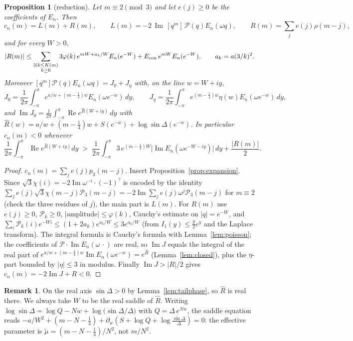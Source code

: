 \documentclass[11pt,reqno]{amsart}
\theoremstyle{plain}
\newtheorem{proposition}[theorem]{Proposition}
\theoremstyle{definition}
\newtheorem{remark}[theorem]{Remark}
\newcommand{\Rh}{\widehat{R}}
\newcommand{\cP}{\mathcal{P}}
\renewcommand{\Re}{\operatorname{Re}}
\renewcommand{\Im}{\operatorname{Im}}
\begin{document}
\begin{proposition}[reduction]\label{prop:reduce}
Let $m\equiv2\pmod 3$ and let $e(j)\ge0$ be the coefficients of $E_n$. Then
\[
c_n(m)=L(m)+R(m),\qquad L(m)=-2\,\Im\,[q^m]\,\cP(q)E_n(\omega q),\qquad R(m)=\sum_j e(j)\rho(m-j),
\]
and for every $W>0$,
\[
|R(m)|\le \sum_{\substack{3\mid k\le K(m)\\k\ge6}}3\varphi(k)\,e^{mW+a_k/W}E_n(e^{-W})+E_{\rm con}\,e^{mW}E_n(e^{-W}),\qquad a_k=a(3/k)^2 .
\]
Moreover $[q^m]\cP(q)E_n(\omega q)=J_0+J_\eta$ with, on the line $w=W+iy$,
\[
J_0=\frac1{2\pi}\int_{-\pi}^{\pi}e^{a/w+(m-\frac14)w}E_n(\omega e^{-w})\,dy,\qquad
J_\eta=\frac1{2\pi}\int_{-\pi}^{\pi}e^{(m-\frac14)w}\eta(w)E_n(\omega e^{-w})\,dy,
\]
and $\Im J_0=\frac1{2\pi}\int_{-\pi}^{\pi}\Re e^{\Rh(W+iy)}\,dy$ with $\Rh(w)=a/w+(m-\frac14)w+S(e^{-w})+\log\sin\Delta(e^{-w})$.
In particular $c_n(m)<0$ whenever
\begin{equation}\label{eq:signcrit}
\frac1{2\pi}\int_{-\pi}^{\pi}\Re e^{\Rh(W+iy)}dy\;>\;\frac1{2\pi}\int_{-\pi}^{\pi}3\,e^{(m-\frac14)W}\bigl|\Im E_n(\omega e^{-W-iy})\bigr|\,dy+\frac{|R(m)|}2 .
\end{equation}
\end{proposition}
\begin{proof}
$c_n(m)=\sum_je(j)p_3(m-j)$. Insert Proposition~\ref{prop:expansion}. Since $\sqrt3\chi(i)=-2\Im\omega^{-i}\cdot(-1)^{?}$ is encoded by
the identity $\sum_je(j)\sqrt3\chi(m-j)\cP_3(m-j)=-2\Im\sum_je(j)\omega^j\cP_3(m-j)$ for $m\equiv2$ (check the three residues of $j$),
the main part is $L(m)$. For $R(m)$ use $e(j)\ge0$, $\cP_k\ge0$, $|\text{amplitude}|\le\varphi(k)$, Cauchy's estimate on $|q|=e^{-W}$,
and $\sum_i\cP_k(i)e^{-Wi}\le(1+2a_k)e^{a_k/W}\le3e^{a_k/W}$ (from $I_1(y)\le\frac y2e^y$ and the Laplace transform). The integral
formula is Cauchy's formula with Lemma~\ref{lem:poisson}; the coefficients of $\cP\cdot\Im E_n(\omega\,\cdot)$ are real, so $\Im J$
equals the integral of the real part of $e^{a/w+(m-\frac14)w}\Im E_n(\omega e^{-w})=e^{\Rh}$ (Lemma~\ref{lem:closed}), plus the
$\eta$-part bounded by $|\eta|\le 3$ in modulus. Finally $\Im J>|R|/2$ gives $c_n(m)=-2\Im J+R<0$.
\end{proof}

\begin{remark}
On the real axis $\sin\Delta>0$ by Lemma~\ref{lem:tailphase}, so $\Rh$ is real there. We always take $W$ to be the real saddle of $\Rh$.
Writing $\log\sin\Delta=\log Q-Nw+\log\bigl(\sin\Delta/\Delta\bigr)$ with $Q=\Delta\,e^{Nw}$, the saddle equation reads
$-a/W^2+(m-N-\frac14)+\partial_w(S+\log Q+\log\frac{\sin\Delta}{\Delta})=0$: the effective parameter is
$\tilde\mu=(m-N-\frac14)/N^2$, not $m/N^2$.
\end{remark}
\end{document}
